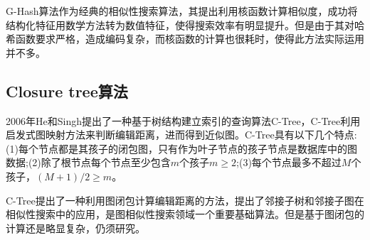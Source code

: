 \documentclass{XDBAthesis}
\begin{document}
G-Hash算法作为经典的相似性搜索算法，其提出利用核函数计算相似度，成功将结构化特征用数学方法转为数值特征，使得搜索效率有明显提升。但是由于其对哈希函数要求严格，造成编码复杂，而核函数的计算也很耗时，使得此方法实际运用并不多。

\subsection{Closure tree算法}
2006年He和Singh提出了一种基于树结构建立索引的查询算法C-Tree\cite{C-Tree}，C-Tree利用启发式图映射方法来判断编辑距离，进而得到近似图。C-Tree具有以下几个特点\cite{DTS}:(1)每个节点都是其孩子的闭包图，只有作为叶子节点的孩子节点是数据库中的图数据;(2)除了根节点每个节点至少包含$m$个孩子$m\geq 2$;(3)每个节点最多不超过$M$个孩子，$(M+1)/2\geq m$。

C-Tree提出了一种利用图闭包计算编辑距离的方法，提出了邻接子树和邻接子图在相似性搜索中的应用，是图相似性搜索领域一个重要基础算法。但是基于图闭包的计算还是略显复杂，仍须研究。

\ifx\allfiles\undefined


\end{document}
